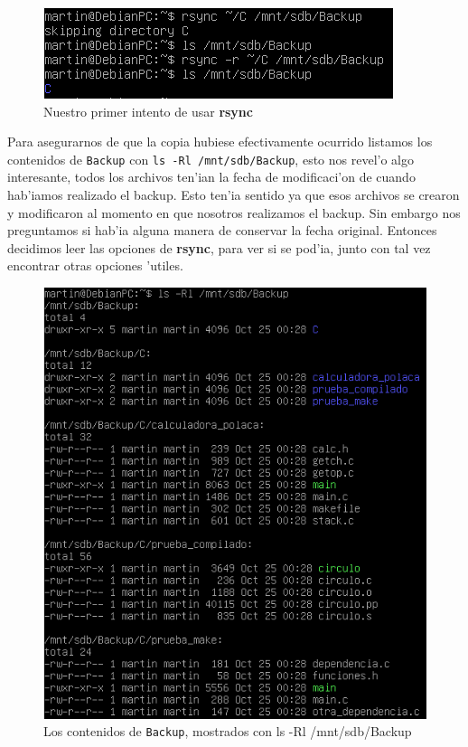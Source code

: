 \documentclass[11pt]{article}
\newcommand{\rsync}[0]{\textbf{rsync}}
\newcommand{\backup}[0]{\texttt{Backup}}
\begin{document}
		\begin{figure}[H]
    			\centering
    			\includegraphics[scale=0.80]{Images/rsync/rsync_backup_first_try.PNG}
    			\caption{Nuestro primer intento de usar \rsync{}}
    			\label{fig:rsync_backup_first_try}
		\end{figure}

		Para asegurarnos de que la copia hubiese efectivamente ocurrido listamos los contenidos de \backup{} con \texttt{ls -Rl /mnt/sdb/Backup}, esto nos revel'o algo interesante, todos los archivos ten'ian la fecha de modificaci'on de cuando hab'iamos realizado el backup. Esto ten'ia sentido ya que esos archivos se crearon y modificaron al momento en que nosotros realizamos el backup. Sin embargo nos preguntamos si hab'ia alguna manera de conservar la fecha original. Entonces decidimos leer las opciones de \rsync{}, para ver si se pod'ia, junto con tal vez encontrar otras opciones 'utiles.

		\begin{figure}[H]
    			\centering
    			\includegraphics[scale=0.80]{Images/rsync/rsync_backup_contents.PNG}
    			\caption{Los contenidos de \backup{}, mostrados con {ls -Rl /mnt/sdb/Backup}}
    			\label{fig:rsync_backup_contents}
		\end{figure}
\end{document}
